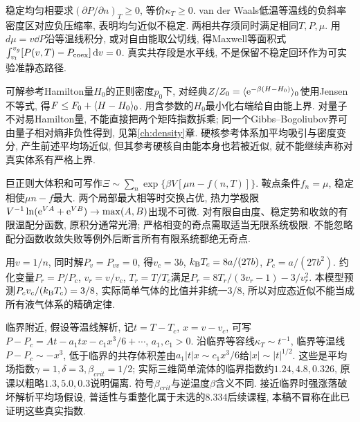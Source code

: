 稳定均匀相要求$(\partial P/\partial n)_T\ge0$, 等价$\kappa_T\ge0$. van der Waals低温等温线的负斜率密度区对应负压缩率, 表明均匀近似不稳定. 两相共存须同时满足相同$T,P,\mu$. 用$d\mu=v\dd P$沿等温线积分, 或对自由能取公切线, 得Maxwell等面积式$\int_{v_l}^{v_g}[P(v,T)-P_{\rm coex}]\,\mathrm d v=0$. 真实共存段是水平线, 不是保留不稳定回环作为可实验准静态路径.

可解参考Hamilton量$H_0$的正则密度$p_0$下, 对经典$Z/Z_0=\langle \mathrm e^{-\beta(H-H_0)}\rangle_0$使用Jensen不等式, 得$F\le F_0+\langle H-H_0\rangle_0$. 用含参数的$H_0$最小化右端给自由能上界. 对量子不对易Hamilton量, 不能直接把两个矩阵指数拆乘; 同一个Gibbs--Bogoliubov界可由量子相对熵非负性得到, 见第\ref{ch:density}章. 硬核参考体系加平均吸引与密度变分, 产生前述平均场近似, 但其参考硬核自由能本身也若被近似, 就不能继续声称对真实体系有严格上界.

巨正则大体积和可写作$\Xi\sim\sum_n\exp\{\beta V[\mu n-f(n,T)]\}$. 鞍点条件$f_n=\mu$, 稳定相使$\mu n-f$最大. 两个局部最大相等时交换占优, 热力学极限$V^{-1}\ln(\mathrm e^{VA}+\mathrm e^{VB})\to\max(A,B)$出现不可微. 对有限自由度、稳定势和收敛的有限温配分函数, 原积分通常光滑; 严格相变的奇点需取适当无限系统极限. 不能忽略配分函数收敛失败等例外后断言所有有限系统都绝无奇点.

用$v=1/n$, 同时解$P_v=P_{vv}=0$, 得$v_c=3b$, $k_{\mathrm B} T_c=8a/(27b)$, $P_c=a/(27b^2)$. 约化变量$P_r=P/P_c$, $v_r=v/v_c$, $T_r=T/T_c$满足$P_r=8T_r/(3v_r-1)-3/v_r^2$. 本模型预测$P_cv_c/(k_{\mathrm B} T_c)=3/8$, 实际简单气体的比值并非统一3/8, 所以对应态近似不能当成所有液气体系的精确定律.

临界附近, 假设等温线解析, 记$t=T-T_c$, $x=v-v_c$, 可写$P-P_c=A t-a_1tx-c_1x^3/6+\cdots$, $a_1,c_1>0$. 沿临界等容线$\kappa_T\sim t^{-1}$, 临界等温线$P-P_c\sim-x^3$, 低于临界的共存体积差由$a_1|t|x\sim c_1x^3/6$给$|x|\sim|t|^{1/2}$. 这些是平均场指数$\gamma=1,\delta=3,\beta_{crit}=1/2$; 实际三维简单流体的临界指数约$1.24,4.8,0.326$, 原课以粗略$1.3,5.0,0.3$说明偏离. 符号$\beta_{crit}$与逆温度$\beta$含义不同. 接近临界时强涨落破坏解析平均场假设, 普适性与重整化属于未选的8.334后续课程, 本稿不冒称在此已证明这些真实指数.
